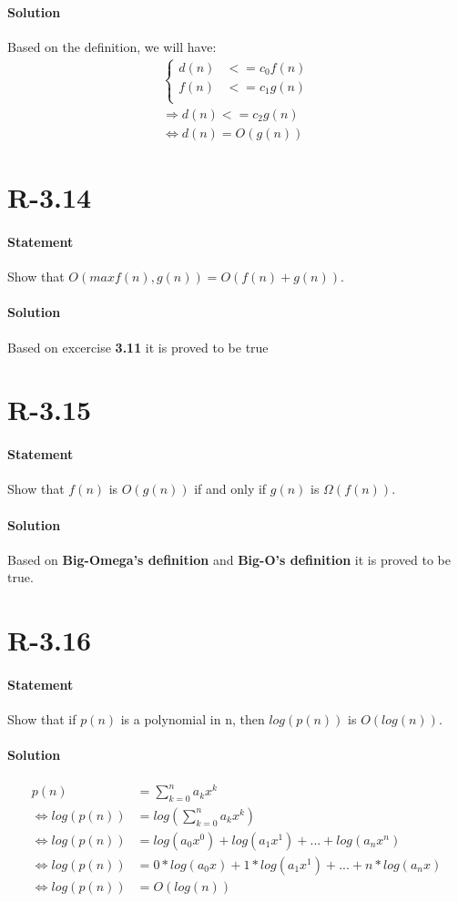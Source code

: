 \documentclass{article}
\begin{document}
\paragraph{Solution}
  Based on the definition, we will have:
  \begin{align*}
    \begin{cases}
    d(n) &<= c_{0}f(n)\\
    f(n) &<= c_{1}g(n)\\
    \end{cases}\\
    \Rightarrow d(n) <= c_{2}g(n)\\
    \Leftrightarrow d(n) = O(g(n))
  \end{align*}
\section{R-3.14}
\paragraph{Statement}
Show that $O(max{f(n),g(n)}) = O(f(n) + g(n))$.
\paragraph{Solution}
  Based on excercise \textbf{3.11} it is proved to be true
\section{R-3.15}
\paragraph{Statement}
Show that $f(n)$ is $O(g(n))$ if and only if $g(n)$ is $\Omega( f (n))$.
\paragraph{Solution}
  Based on \textbf{Big-Omega's definition} and \textbf{Big-O's definition} it is proved to be true.
\newpage
\section{R-3.16}
\paragraph{Statement}
Show that if $p(n)$ is a polynomial in n, then $log(p(n))$ is $O(log(n))$.
\paragraph{Solution}
  \begin{align*}
    p(n) &= \sum_{k=0}^{n} a_{k}x^{k}\\
    \Leftrightarrow log(p(n)) &= log(\sum_{k=0}^{n} a_{k}x^{k})\\
    \Leftrightarrow log(p(n)) &= log(a_{0}x^{0}) + log(a_{1}x^{1}) + ... +log(a_{n}x^{n})\\
    \Leftrightarrow log(p(n)) &= 0*log(a_{0}x) + 1*log(a_{1}x^{1}) + ... + n*log(a_{n}x)\\
    \Leftrightarrow log(p(n)) &= O(log(n))
  \end{align*}
\end{document}
